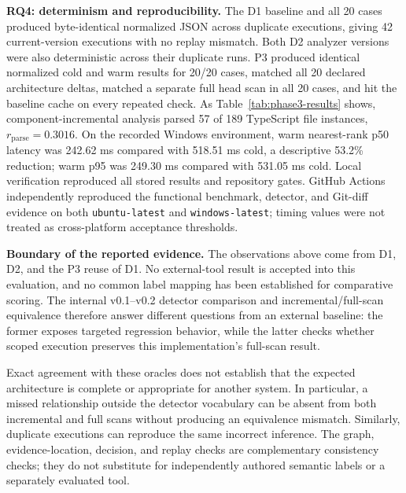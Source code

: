 \textbf{RQ4: determinism and reproducibility.}
The D1 baseline and all 20 cases produced byte-identical normalized JSON across duplicate executions, giving 42 current-version executions with no replay mismatch. Both D2 analyzer versions were also deterministic across their duplicate runs. P3 produced identical normalized cold and warm results for 20/20 cases, matched all 20 declared architecture deltas, matched a separate full head scan in all 20 cases, and hit the baseline cache on every repeated check. As Table~\ref{tab:phase3-results} shows, component-incremental analysis parsed 57 of 189 TypeScript file instances, $r_{\mathrm{parse}}=0.3016$. On the recorded Windows environment, warm nearest-rank p50 latency was 242.62 ms compared with 518.51 ms cold, a descriptive 53.2\% reduction; warm p95 was 249.30 ms compared with 531.05 ms cold. Local verification reproduced all stored results and repository gates. GitHub Actions independently reproduced the functional benchmark, detector, and Git-diff evidence on both \texttt{ubuntu-latest} and \texttt{windows-latest}; timing values were not treated as cross-platform acceptance thresholds.

\textbf{Boundary of the reported evidence.}
The observations above come from D1, D2, and the P3 reuse of D1. No external-tool result is accepted into this evaluation, and no common label mapping has been established for comparative scoring. The internal v0.1--v0.2 detector comparison and incremental/full-scan equivalence therefore answer different questions from an external baseline: the former exposes targeted regression behavior, while the latter checks whether scoped execution preserves this implementation's full-scan result.

Exact agreement with these oracles does not establish that the expected architecture is complete or appropriate for another system. In particular, a missed relationship outside the detector vocabulary can be absent from both incremental and full scans without producing an equivalence mismatch. Similarly, duplicate executions can reproduce the same incorrect inference. The graph, evidence-location, decision, and replay checks are complementary consistency checks; they do not substitute for independently authored semantic labels or a separately evaluated tool.
